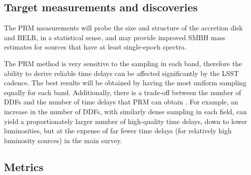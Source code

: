 
\subsection{Target measurements and discoveries}
\label{sec:keyword:targets}



The PRM measurements will probe the size and structure of the
accretion disk and BELR, in a statistical sense, and may provide
improved SMBH mass estimates for sources that have at least
single-epoch spectra. 

The PRM method is very sensitive to the sampling in each band,
therefore the ability to derive reliable time delays can be affected
significantly by the LSST cadence. The best results will be obtained
by having the most uniform sampling equally for each band.
Additionally, there is a trade-off between the number of DDFs and the
number of time delays that PRM can obtain \citep{CheloucheEtal2014}.
For example, an increase in the number of DDFs, with similarly dense
sampling in each field, can yield a proportionately larger number of
high-quality time delays, down to lower luminosities, but at the
expense of far fewer time delays (for relatively high luminosity
sources) in the main survey.


\subsection{Metrics}
\label{sec:keyword:metrics}

